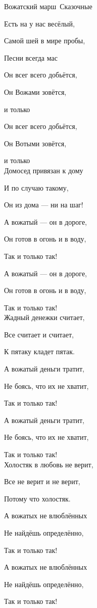 \documentclass[11pt,a5paper]{book}
\begin{document}
\begin{song}{Вожатский марш}{}{~}{Сказочные}{}{}

Есть на у нас весёлый,\par
Самой шей в мире пробы,\par
Песни  всегда мас\par
Он всег всего добьётся,\par
Он Вожами зовётся,\par
{} и только \par
Он всег всего добьётся,\par
Он Вотыми зовётся,\par
{} и только \\

Домосед привязан к дому\par
И по случаю такому,\par
Он из дома — ни на шаг!\par
А вожатый — он в дороге,\par
Он готов в огонь и в воду,\par
Так и только так!\par
А вожатый — он в дороге,\par
Он готов в огонь и в воду,\par
Так и только так!\\
\newpage
Жадный денежки считает,\par
Все считает и считает,\par
К пятаку кладет пятак.\par
А вожатый деньги тратит,\par
Не боясь, что их не хватит,\par
Так и только так!\par
А вожатый деньги тратит,\par
Не боясь, что их не хватит,\par
Так и только так!\\

Холостяк в любовь не верит,\par
Все не верит и не верит,\par
Потому что холостяк.\par
А вожатых не влюблённых\par
Не найдёшь определённо,\par
Так и только так!\par
А вожатых не влюблённых\par
Не найдёшь определённо,\par
Так и только так!\par


\end{song}
\end{document}
